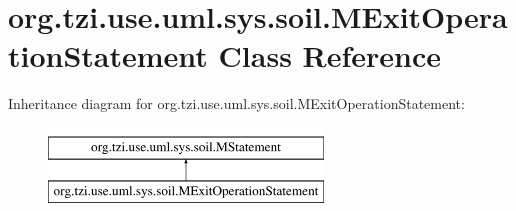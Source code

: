 \hypertarget{classorg_1_1tzi_1_1use_1_1uml_1_1sys_1_1soil_1_1_m_exit_operation_statement}{\section{org.\-tzi.\-use.\-uml.\-sys.\-soil.\-M\-Exit\-Operation\-Statement Class Reference}
\label{classorg_1_1tzi_1_1use_1_1uml_1_1sys_1_1soil_1_1_m_exit_operation_statement}
}
Inheritance diagram for org.\-tzi.\-use.\-uml.\-sys.\-soil.\-M\-Exit\-Operation\-Statement\-:\begin{figure}[H]
\begin{center}
\leavevmode
\includegraphics[height=2.000000cm]{classorg_1_1tzi_1_1use_1_1uml_1_1sys_1_1soil_1_1_m_exit_operation_statement}
\end{center}
\end{figure}
